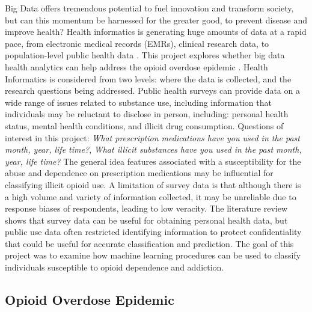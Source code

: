 \documentclass[sigconf]{acmart}
\begin{document}
Big Data offers tremendous potential to fuel innovation and transform society, 
but can this momentum be harnessed for the greater good, to prevent disease 
and improve health? Health informatics is generating huge amounts of data at a 
rapid pace, from electronic medical records (EMRs), clinical research data, to 
population-level public health data \cite{herland14}. This project explores 
whether big data health analytics can help address the opioid overdose epidemic 
\cite{cdc16}. Health Informatics is considered from two levels: where the data 
is collected, and the research questions being addressed. Public health surveys
can provide data on a wide range of issues related to substance use, including 
information that individuals may be reluctant to disclose in person, including: 
personal health status, mental health conditions, and illicit drug consumption.  
Questions of interest in this project: \textit{What prescription medications 
have you used in the past month, year, life time?}, \textit{What illicit
substances have you used in the past month, year, life time?} The general idea 
features associated with a susceptibility for the abuse and dependence on 
prescription medications may be influential for classifying illicit opioid use. 
A limitation of survey data is that although there is a high volume and variety 
of information collected, it may be unreliable due to response biases of 
respondents, leading to low veracity. The literature review shows that survey
data can be useful for obtaining personal health data, but public use data 
often restricted identifying information to protect confidentiality that could
be useful for accurate classification and prediction. The goal of this project 
was to examine how machine learning procedures can be used to classify 
individuals susceptible to opioid dependence and addiction.

\subsection{Opioid Overdose Epidemic}
\end{document}
